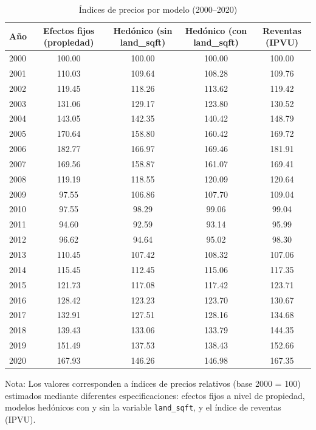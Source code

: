 \documentclass[conference]{IEEEtran}
\begin{document}
\begin{table}[H]
\tiny
\centering
\caption{Índices de precios por modelo (2000–2020)}
\begin{threeparttable}
\begin{tabular}{lcccc}
\toprule
Año & Efectos fijos (propiedad) & Hedónico (sin land\_sqft) & Hedónico (con land\_sqft) & Reventas (IPVU) \\
\midrule
2000 & 100.00 & 100.00 & 100.00 & 100.00 \\
2001 & 110.03 & 109.64 & 108.28 & 109.76 \\
2002 & 119.45 & 118.26 & 113.62 & 119.42 \\
2003 & 131.06 & 129.17 & 123.80 & 130.52 \\
2004 & 143.05 & 142.35 & 140.42 & 148.79 \\
2005 & 170.64 & 158.80 & 160.42 & 169.72 \\
2006 & 182.77 & 166.97 & 169.46 & 181.91 \\
2007 & 169.56 & 158.87 & 161.07 & 169.41 \\
2008 & 119.19 & 118.55 & 120.09 & 120.64 \\
2009 & 97.55  & 106.86 & 107.70 & 109.04 \\
2010 & 97.55  & 98.29  & 99.06  & 99.04 \\
2011 & 94.60  & 92.59  & 93.14  & 95.99 \\
2012 & 96.62  & 94.64  & 95.02  & 98.30 \\
2013 & 110.45 & 107.42 & 108.32 & 107.06 \\
2014 & 115.45 & 112.45 & 115.06 & 117.35 \\
2015 & 121.73 & 117.08 & 117.42 & 123.71 \\
2016 & 128.42 & 123.23 & 123.70 & 130.67 \\
2017 & 132.91 & 127.51 & 128.16 & 134.68 \\
2018 & 139.43 & 133.06 & 133.79 & 144.35 \\
2019 & 151.49 & 137.53 & 138.43 & 152.66 \\
2020 & 167.93 & 146.26 & 146.98 & 167.35 \\
\bottomrule
\end{tabular}
\begin{tablenotes}
\footnotesize
\item Nota: Los valores corresponden a índices de precios relativos (base 2000 = 100) estimados mediante diferentes especificaciones: efectos fijos a nivel de propiedad, modelos hedónicos con y sin la variable \texttt{land\_sqft}, y el índice de reventas (IPVU).
\end{tablenotes}
\end{threeparttable}
\end{table}
\end{document}
